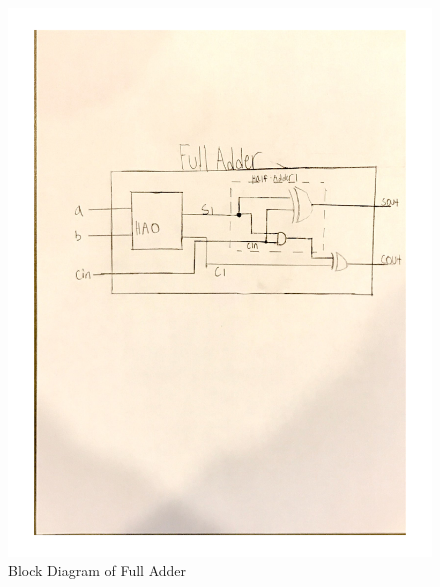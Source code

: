 \documentclass[11pt]{article}
\begin{document}
\begin{figure}
	\includegraphics[width=1.0\textwidth]{"FullAdderDia"}
	\caption{Block Diagram of Full Adder}
\end{figure}
\clearpage
\end{document}
